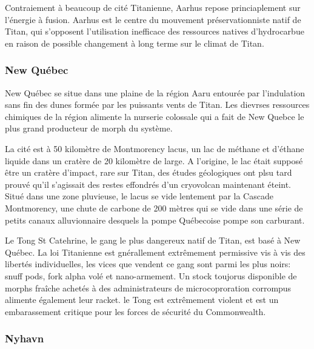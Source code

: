 Contraiement à beaucoup de cité Titanienne, Aarhus repose princiaplement sur l'énergie à fusion. Aarhus est le centre du mouvement préservationniste natif de Titan, qui s'opposent l'utilisation inefficace des ressources natives d'hydrocarbue en raison de possible changement à long terme sur le climat de Titan. 

\subsubsection{New Québec} \label{sec:new-quebec} 

New Québec se situe dans une plaine de la région Aaru entourée par l'indulation sans fin des dunes formée par les puissants vents de Titan. Les dievrses ressources chimiques de la région alimente la nurserie colossale qui a fait de New Quebce le plus grand producteur de morph du système. 

La cité est à 50 kilomètre de Montmorency lacus, un lac de méthane et d'éthane liquide dans un cratère de 20 kilomètre de large. A l'origine, le lac était supposé être un cratère d'impact, rare sur Titan, des études géologiques ont plsu tard prouvé qu'il s'agissait des restes effondrés d'un cryovolcan maintenant éteint. Situé dans une zone pluvieuse, le lacus se vide lentement par la Cascade Montmorency, une chute de carbone de 200 mètres qui se vide dans une série de petits canaux alluvionnaire desquels la pompe Québecoise pompe son carburant. 

Le Tong St Catehrine, le gang le plus dangereux natif de Titan, est basé à New Québec. La loi Titanienne est gnérallement extrêmement permissive vis à vis des libertés individuelles, les vices que vendent ce gang sont parmi les plus noirs: snuff pods, fork alpha volé et nano-armement. Un stock toujorus disponible de morphs fraîche achetés à des administrateurs de microcoproration corrompus alimente également leur racket. le Tong est extrêmement violent et est un embarassement critique pour les forces de sécurité du Commonwealth. 

\subsubsection{Nyhavn} \label{sec:nyhavn} 

